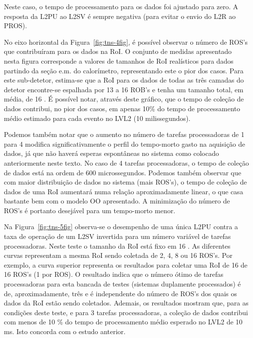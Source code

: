 Neste caso, o tempo de processamento para os dados foi ajustado para zero. A
resposta da L2PU ao L2SV é sempre negativa (para evitar o envio do L2R ao
PROS). 

No eixo horizontal da Figura~\ref{fig:tns-4fig}, é possível observar o número
de ROS's que contribuíram para os dados na RoI. O conjunto de medidas
apresentado nesta figura corresponde a valores de tamanhos de RoI realísticos
para dados partindo da seção e.m. do calorímetro, representando este o pior
dos casos. Para este sub-detetor, estima-se que a RoI para os dados de todas
as três camadas do detetor encontre-se espalhada por 13 a 16 ROB's e tenha um
tamanho total, em média, de 16 . É possível notar, através
deste gráfico, que o tempo de coleção de dados contribui, no pior dos casos,
em apenas 10\% do tempo de processamento médio estimado para cada evento no
LVL2 (10 milissegundos).

Podemos também notar que o aumento no número de tarefas processadoras de 1
para 4 modifica significativamente o perfil do tempo-morto gasto na aquisição
de dados, já que não haverá esperas espontâneas no sistema como colocado
anteriormente neste texto. No caso de 4 tarefas processadoras, o tempo de
coleção de dados está na ordem de 600 microssegundos. Podemos também observar
que com maior distribuição de dados no sistema (mais ROS's), o tempo de
coleção de dados de uma RoI aumentará numa relação aproximadamente linear, o
que casa bastante bem com o modelo OO apresentado. A minimização do número de
ROS's é portanto desejável para um tempo-morto menor.

Na Figura~\ref{fig:tns-5fig} observa-se o desempenho de uma única L2PU contra
a taxa de operação de um L2SV invertida para um número variável de tarefas
processadoras. Neste teste o tamanho da RoI está fixo em 16
. As diferentes curvas representam a mesma RoI sendo coletada
de 2, 4, 8 ou 16 ROS's. Por exemplo, a curva superior representa os resultados
para coletar uma RoI de 16  de 16 ROS's (1  por
ROS). O resultado indica que o número ótimo de tarefas processadoras para esta
bancada de testes (sistemas duplamente processados) é de, aproximadamente,
três e é independente do número de ROS's dos quais os dados da RoI estão sendo
coletados. Ademais, os resultados mostram que, para as condições deste teste,
e para 3 tarefas processadoras, a coleção de dados contribui com menos de 10
\% do tempo de processamento médio esperado no LVL2 de 10 ms. Isto concorda
com o estudo anterior.

